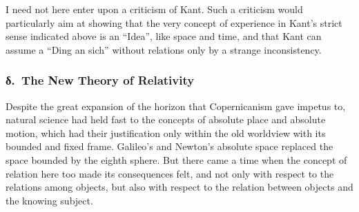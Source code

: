 \documentclass[12pt]{article}
\newcommand{\opage}[1]{\marginnote{\footnotesize\textit{[#1]}}}
\begin{document}
I need not here enter upon a criticism of Kant. Such a criticism would
particularly aim at showing that the very concept of experience in Kant's
strict sense indicated above is an ``Idea'', like space and time, and that
Kant can assume a ``Ding an sich'' without relations only by a strange
inconsistency.

\subsubsection*{δ.~The New Theory of Relativity}
\label{sec:3d-delta}
%

\noindent \opage{72}Despite the great expansion of the horizon that Copernicanism
gave impetus to, natural science had held fast to the concepts of absolute
place and absolute motion, which had their justification only within the
old worldview with its bounded and fixed frame. Galileo's and Newton's
absolute space replaced the space bounded by the eighth sphere. But there
came a time when the concept of relation here too made its consequences
felt, and not only with respect to the relations among objects, but also
with respect to the relation between objects and the knowing subject.
\end{document}
